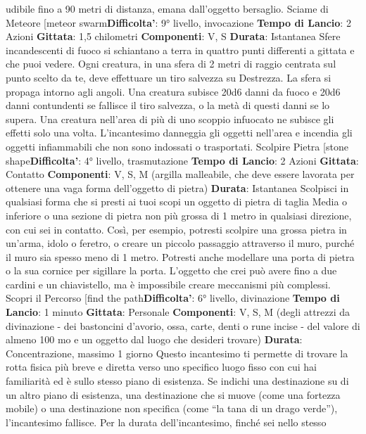 \begin{multicols}{2}
udibile fino a 90 metri di distanza, emana dall’oggetto
bersaglio.
Sciame di Meteore
[meteor swarm\textbf{Difficolta'}:
9° livello, invocazione
\textbf{Tempo di Lancio}: 2 Azioni
\textbf{Gittata}: 1,5 chilometri
\textbf{Componenti}: V, S
\textbf{Durata}: Istantanea
Sfere incandescenti di fuoco si schiantano a terra in
quattro punti differenti a gittata e che puoi vedere. Ogni
creatura, in una sfera di 2 metri di raggio centrata sul
punto scelto da te, deve effettuare un tiro salvezza su
Destrezza. La sfera si propaga intorno agli angoli. Una
creatura subisce 20d6 danni da fuoco e 20d6 danni
contundenti se fallisce il tiro salvezza, o la metà di
questi danni se lo supera. Una creatura nell’area di più
di uno scoppio infuocato ne subisce gli effetti solo una
volta.
L’incantesimo danneggia gli oggetti nell’area e incendia
gli oggetti infiammabili che non sono indossati o
trasportati.
Scolpire Pietra
[stone shape\textbf{Difficolta'}:
4° livello, trasmutazione
\textbf{Tempo di Lancio}: 2 Azioni
\textbf{Gittata}: Contatto
\textbf{Componenti}: V, S, M (argilla malleabile, che deve
essere lavorata per ottenere una vaga forma
dell’oggetto di pietra)
\textbf{Durata}: Istantanea
Scolpisci in qualsiasi forma che si presti ai tuoi scopi un
oggetto di pietra di taglia Media o inferiore o una
sezione di pietra non più grossa di 1 metro in qualsiasi
direzione, con cui sei in contatto.
Così, per esempio, potresti scolpire una grossa pietra in
un’arma, idolo o feretro, o creare un piccolo passaggio
attraverso il muro, purché il muro sia spesso meno di
1 metro. Potresti anche modellare una porta di pietra o
la sua cornice per sigillare la porta. L’oggetto che crei
può avere fino a due cardini e un chiavistello, ma è
impossibile creare meccanismi più complessi.
Scopri il Percorso
[find the path\textbf{Difficolta'}:
6° livello, divinazione
\textbf{Tempo di Lancio}: 1 minuto
\textbf{Gittata}: Personale
\textbf{Componenti}: V, S, M (degli attrezzi da divinazione -
dei bastoncini d’avorio, ossa, carte, denti o rune incise -
del valore di almeno 100 mo e un oggetto dal luogo che
desideri trovare)
\textbf{Durata}: Concentrazione, massimo 1 giorno
Questo incantesimo ti permette di trovare la rotta fisica
più breve e diretta verso uno specifico luogo fisso con
cui hai familiarità ed è sullo stesso piano di esistenza.
Se indichi una destinazione su di un altro piano di
esistenza, una destinazione che si muove (come una 
fortezza mobile) o una destinazione non specifica
(come “la tana di un drago verde”), l’incantesimo
fallisce.
Per la durata dell’incantesimo, finché sei nello stesso

\end{multicols}

